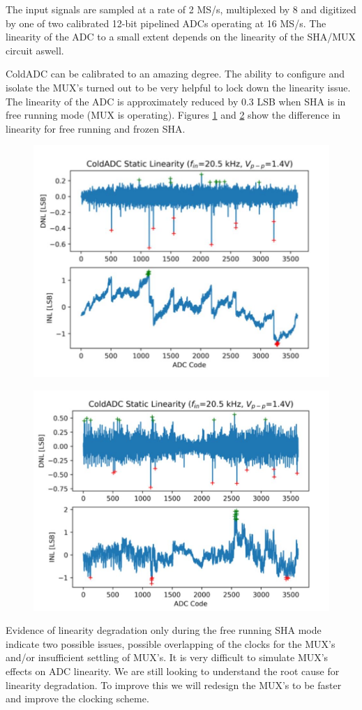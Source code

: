 \label{sec:5.4}


The input signals are sampled at a rate of 2 MS/s, multiplexed by 8 and digitized by one of two calibrated 12-bit pipelined ADCs operating at 16 MS/s. The linearity of the ADC to a small extent depends on the linearity of the SHA/MUX circuit aswell. 

ColdADC can be calibrated to an amazing degree. The ability to configure and isolate the MUX's turned out to be very helpful to lock down the linearity issue. The linearity of the ADC is approximately reduced by 0.3 LSB when SHA is in free running mode (MUX is operating). Figures \ref{fig:linearity_freesha} and \ref{fig:linearity_frozensha} show the difference in linearity for free running and frozen SHA. 

\begin{figure}[h!]
\centering
  \includegraphics[width=0.7\linewidth]{figures/prakash_fig/linearity_freesha.JPG}
  \caption{}
  \label{fig:linearity_freesha}
\end{figure}

\begin{figure}[h!]
\centering
  \includegraphics[width=0.7\linewidth]{figures/prakash_fig/linearity_frozensha.JPG}
  \caption{}
  \label{fig:linearity_frozensha}
\end{figure}

Evidence of linearity degradation only during the free running SHA mode indicate two possible issues, possible overlapping of the clocks for the MUX's and/or insufficient settling of MUX's. It is very difficult to simulate MUX's effects on ADC linearity. We are still looking to understand the root cause for linearity degradation. To improve this we will redesign the MUX's to be faster and improve the clocking scheme. 